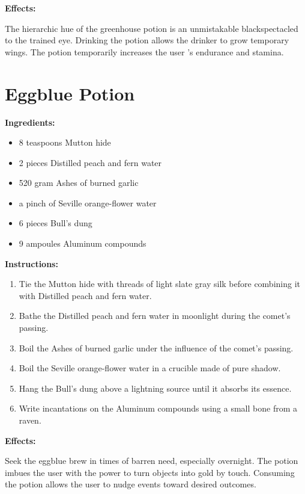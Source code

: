 \documentclass{article}
\begin{document}
\textbf{Effects:}

The hierarchic hue of the greenhouse potion is an unmistakable blackspectacled to the trained eye. Drinking the potion allows the drinker to grow temporary wings. The potion temporarily increases the user 's endurance and stamina.

\newpage
\section*{Eggblue Potion}

\textbf{Ingredients:}

\begin{itemize}
  \item 8 teaspoons Mutton hide
  \item 2 pieces Distilled peach and fern water
  \item 520 gram Ashes of burned garlic
  \item a pinch of Seville orange-flower water
  \item 6 pieces Bull's dung
  \item 9 ampoules Aluminum compounds
\end{itemize}

\textbf{Instructions:}

\begin{enumerate}
  \item Tie the Mutton hide with threads of light slate gray silk before combining it with Distilled peach and fern water.
  \item Bathe the Distilled peach and fern water in moonlight during the comet’s passing.
  \item Boil the Ashes of burned garlic under the influence of the comet’s passing.
  \item Boil the Seville orange-flower water in a crucible made of pure shadow.
  \item Hang the Bull's dung above a lightning source until it absorbs its essence.
  \item Write incantations on the Aluminum compounds using a small bone from a raven.
\end{enumerate}

\textbf{Effects:}

Seek the eggblue brew in times of barren need, especially overnight. The potion imbues the user with the power to turn objects into gold by touch. Consuming the potion allows the user to nudge events toward desired outcomes.
\end{document}
